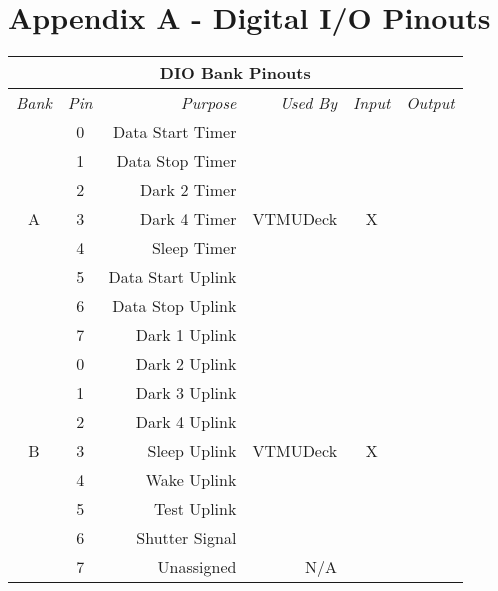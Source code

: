 %

\section{Appendix A - Digital I/O Pinouts}

\begin{tabular}{|c|c|r|r|c|c|}\hline
\multicolumn{6}{|c|}{\bf DIO Bank Pinouts}\\ \hline
\it Bank &\it Pin &\it Purpose &\it Used By &\it Input &\it Output \\ \hline\hline

         & 0      & Data Start Timer &      &          & \\ \cline{2 - 3}
         & 1      & Data Stop Timer  &      &          & \\ \cline{2 - 3}
	 & 2      & Dark 2    Timer  &      &          & \\ \cline{2 - 3}
 A	 & 3      & Dark 4    Timer  & VTMUDeck & X    & \\ \cline{2 - 3}
         & 4      & Sleep     Timer  &      &          & \\ \cline{2 - 3}
         & 5      & Data Start Uplink &     &          & \\ \cline{2 - 3}
	 & 6      & Data Stop Uplink &      &          & \\ \cline{2 - 3}
	 & 7      & Dark 1 Uplink    &      &          & \\ \hline

	 & 0	  & Dark 2 Uplink    &      &          & \\ \cline{2 - 3}
	 & 1      & Dark 3 Uplink    &      &          & \\ \cline{2 - 3}
	 & 2      & Dark 4 Uplink    &      &          & \\ \cline{2 - 3}
 B	 & 3      & Sleep  Uplink    & VTMUDeck & X    & \\ \cline{2 - 3}
         & 4      & Wake   Uplink    &      &          & \\ \cline{2 - 3}
         & 5      & Test   Uplink    &      &          & \\ \cline{2 - 3}
         & 6      & Shutter Signal   &      &          & \\ \cline{2 - 4}
         & 7      & Unassigned       &  N/A &          & \\ \hline


\end{tabular}
